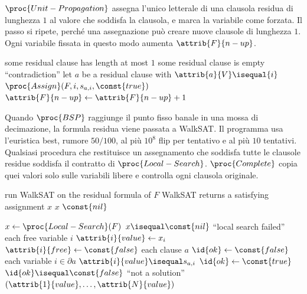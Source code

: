 $\proc{Unit-Propagation}$ assegna l'unico letterale di una clausola residua di lunghezza $1$ al valore che soddisfa la clausola, e marca la variabile come forzata.
Il passo si ripete, perché una assegnazione può creare nuove clausole di lunghezza $1$.
Ogni variabile fissata in questo modo aumenta $\attrib{F}{n-up}$.

\begin{codebox}
\li \While some residual clause has length at most $1$
\li     \Do
            \If some residual clause is empty
\li             \Then \Error ``contradiction''
                \End
\li         let $a$ be a residual clause with $\attrib{a}{V} \isequal \{i\}$
\li         $\proc{Assign}(F, i, s_{a,i}, \const{true})$
\li         $\attrib{F}{n-up} \gets \attrib{F}{n-up}+1$
        \End
\end{codebox}

Quando $\proc{BSP}$ raggiunge il punto fisso banale in una mossa di decimazione, la formula residua viene passata a WalkSAT.
Il programma usa l'euristica best, rumore $50/100$, al più $10^{8}$ flip per tentativo e al più $10$ tentativi.
Qualsiasi procedura che restituisce un assegnamento che soddisfa tutte le clausole residue soddisfa il contratto di $\proc{Local-Search}$.
$\proc{Complete}$ copia quei valori solo sulle variabili libere e controlla ogni clausola originale.

\begin{codebox}
\li run WalkSAT on the residual formula of $F$
\li \If WalkSAT returns a satisfying assignment $x$
\li     \Then \Return $x$
\li     \Else \Return $\const{nil}$
        \End
\end{codebox}

\begin{codebox}
\li $x \gets \proc{Local-Search}(F)$
\li \If $x \isequal \const{nil}$
\li     \Then \Error ``local search failed''
        \End
\li \For each free variable $i$
\li     \Do
            $\attrib{i}{value} \gets x_i$
\li         $\attrib{i}{free} \gets \const{false}$
        \End
\li \For each clause $a$
\li     \Do
            $\id{ok} \gets \const{false}$
\li         \For each variable $i \in \partial a$
\li             \Do
                    \If $\attrib{i}{value} \isequal s_{a,i}$
\li                     \Then $\id{ok} \gets \const{true}$
                        \End
                \End
\li         \If $\id{ok} \isequal \const{false}$
\li             \Then \Error ``not a solution''
                \End
        \End
\li \Return $(\attrib{1}{value}, \ldots, \attrib{N}{value})$
\end{codebox}
